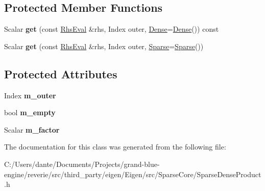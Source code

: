 \subsection*{Protected Member Functions}
\begin{DoxyCompactItemize}
\item 
\mbox{\label{class_eigen_1_1internal_1_1sparse__dense__outer__product__evaluator_1_1_inner_iterator_ab95129da23715cc82ec4a1c6dba518cd}} 
Scalar {\bfseries get} (const \mbox{\hyperlink{struct_eigen_1_1internal_1_1evaluator}{Rhs\+Eval}} \&rhs, Index outer, \mbox{\hyperlink{struct_eigen_1_1_dense}{Dense}}=\mbox{\hyperlink{struct_eigen_1_1_dense}{Dense}}()) const
\item 
\mbox{\label{class_eigen_1_1internal_1_1sparse__dense__outer__product__evaluator_1_1_inner_iterator_a20d8115902e16c608fca8b4fdcb9a920}} 
Scalar {\bfseries get} (const \mbox{\hyperlink{struct_eigen_1_1internal_1_1evaluator}{Rhs\+Eval}} \&rhs, Index outer, \mbox{\hyperlink{struct_eigen_1_1_sparse}{Sparse}}=\mbox{\hyperlink{struct_eigen_1_1_sparse}{Sparse}}())
\end{DoxyCompactItemize}
\subsection*{Protected Attributes}
\begin{DoxyCompactItemize}
\item 
\mbox{\label{class_eigen_1_1internal_1_1sparse__dense__outer__product__evaluator_1_1_inner_iterator_acbef56598eb5e344e5148f34edd32950}} 
Index {\bfseries m\+\_\+outer}
\item 
\mbox{\label{class_eigen_1_1internal_1_1sparse__dense__outer__product__evaluator_1_1_inner_iterator_a9a3831282beeeb6e79c428c09e6038d5}} 
bool {\bfseries m\+\_\+empty}
\item 
\mbox{\label{class_eigen_1_1internal_1_1sparse__dense__outer__product__evaluator_1_1_inner_iterator_a18dc248d76b9934b04cce16512d9ce8c}} 
Scalar {\bfseries m\+\_\+factor}
\end{DoxyCompactItemize}


The documentation for this class was generated from the following file\+:\begin{DoxyCompactItemize}
\item 
C\+:/\+Users/dante/\+Documents/\+Projects/grand-\/blue-\/engine/reverie/src/third\+\_\+party/eigen/\+Eigen/src/\+Sparse\+Core/Sparse\+Dense\+Product.\+h\end{DoxyCompactItemize}
